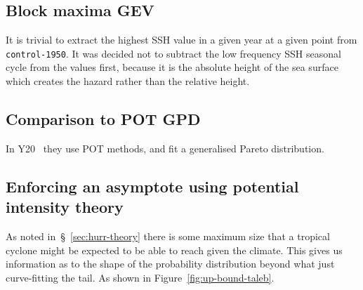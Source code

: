 \subsection{Block maxima GEV}
It is trivial to extract the highest SSH value in a given year at a given point
from \texttt{control-1950}.
It was decided not to subtract the low frequency SSH seasonal cycle from the
values first, because it is the absolute height of the sea surface which
creates the hazard rather than the relative height.





\subsection{Comparison to POT GPD}
In Y20~\cite{ZannaPreprint} they use POT methods, and fit a generalised Pareto distribution.

\subsection{Enforcing an asymptote using potential intensity theory }
As noted in~§~\ref{sec:hurr-theory} there is some maximum size
that a tropical cyclone might be expected to be able to reach given
the climate. This gives us information as to the shape of the probability
distribution beyond what just curve-fitting the tail.
As shown in Figure~\ref{fig:up-bound-taleb}.




\FloatBarrier
